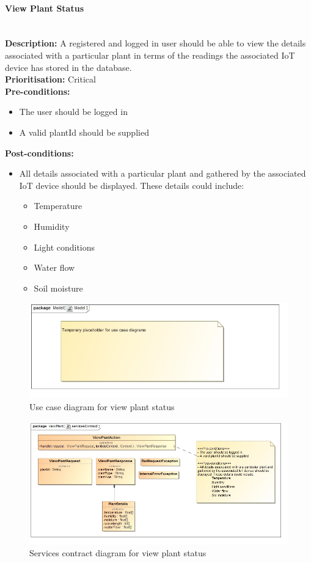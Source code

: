 \documentclass{article}
\begin{document}
	\paragraph{View Plant Status}\mbox{}\\
		\textbf{Description:} A registered and logged in user should be able to view the details associated with a particular plant in terms of the readings the associated IoT device has stored in the database.\\
		\textbf{Prioritisation:} Critical\\		
		\textbf{Pre-conditions:}
			\begin{itemize}
				\item The user should be logged in
				\item A valid plantId should be supplied
			\end{itemize}
		\textbf{Post-conditions:}
			\begin{itemize}
				\item All details associated with a particular plant and gathered by the associated IoT device should be displayed. These details could include:
				\begin{itemize}
					\item Temperature
					\item Humidity
					\item Light conditions
					\item Water flow
					\item Soil moisture
				\end{itemize}
			\end{itemize}

		\begin{figure}[H]
			\includegraphics[width=\linewidth]{images/tempUseCase.jpg}
			\caption{Use case diagram for view plant status}
		\end{figure}
		
		\begin{figure}[H]
			\includegraphics[width=\linewidth]{images/ServicesContracts/viewPlant.jpg}
			\caption{Services contract diagram for view plant status}
		\end{figure}
		
\end{document}
